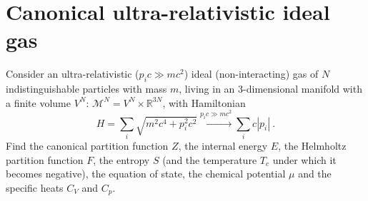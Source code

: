 \section{Canonical ultra-relativistic ideal gas}

    \begin{exercise}
        Consider an ultra-relativistic ($p_i c \gg m c^2$) ideal (non-interacting) gas of $N$ indistinguishable particles with mass $m$, living in an $3$-dimensional manifold with a finite volume $V^N$: $\mathcal M^N = V^N \times \mathbb R^{3N}$, with Hamiltonian
        \begin{equation*}
            H = \sum_i \sqrt{m^2 c^4 + p_i^2 c^2} \xrightarrow{p_i c \gg m c^2} \sum_i c |p_i| ~.
        \end{equation*}
        Find the canonical partition function $Z$, the internal energy $E$, the Helmholtz partition function $F$, the entropy $S$ (and the temperature $T_c$ under which it becomes negative), the equation of state, the chemical potential $\mu$ and the specific heats $C_V$ and $C_p$. 
    \end{exercise}

